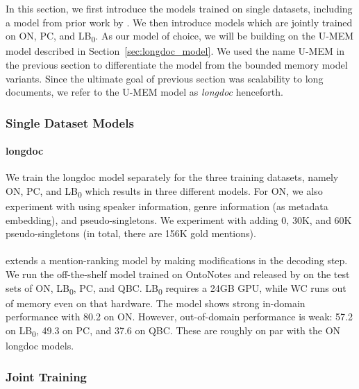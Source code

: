 \documentclass[12pt]{thesis-umich}[thesis]
\begin{document}
In this section, we first introduce the models trained on single datasets, including a model from prior work by \citet{xu-choi-2020-revealing}. We then introduce  models which are jointly trained on ON, PC, and LB\textsubscript{0}. 
As our model of choice, we will be building on the U-MEM model described in Section~\ref{sec:longdoc_model}. We used the name U-MEM in the previous section to differentiate the model from the bounded memory model variants. Since the ultimate goal of previous section was scalability to long documents, we refer to the U-MEM model as \emph{longdoc} henceforth. 


\subsubsection{Single Dataset Models}

\paragraph{longdoc} 
We train the longdoc model separately for the three training datasets, namely ON, PC, and LB\textsubscript{0} which results in three different models. For ON, we also experiment with using speaker information, genre information (as metadata embedding), and pseudo-singletons. We experiment with adding 0, 30K, and 60K 
pseudo-singletons (in total, there are 156K gold mentions).  



\paragraph{\citet{xu-choi-2020-revealing}}
extends a mention-ranking model \cite{lee-etal-2018-higher} by making modifications in the decoding step.
We run the off-the-shelf model trained on OntoNotes and released by \citet{xu-choi-2020-revealing} on the test sets of ON, LB\textsubscript{0}, PC, and QBC. LB\textsubscript{0} requires a 24GB GPU, while WC runs out of memory even on that hardware. The model shows strong in-domain performance with 80.2 on ON. However, out-of-domain performance is weak: 57.2 on LB\textsubscript{0}, 49.3 on PC, and 37.6 on QBC. These are roughly on par with the ON longdoc models. 











\subsubsection{Joint Training}
\end{document}
